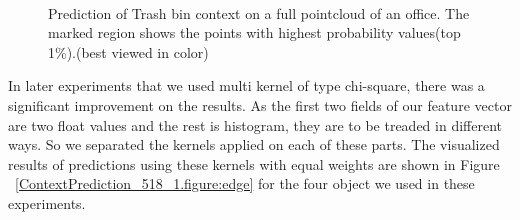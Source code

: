 \begin{figure} [htp]
   \begin{center}
     \\
  \end{center}
  \caption[Prediction of Trash bin model.]
  {Prediction of Trash bin context on a full pointcloud of an office. The marked region shows the points with highest probability values(top 1\%).(best viewed in color)}
  \label{TrashPrediction.figure:edge}
\end{figure}

In later experiments that we used multi kernel of type chi-square, there was a significant improvement on the results.
As the first two fields of our feature vector are two float values and the rest is histogram, they are to be treaded 
in different ways.
So we separated the kernels applied on each of these parts.
The visualized results of predictions using these kernels with equal weights are shown in Figure ~\ref{ContextPrediction_518_1.figure:edge} 
for the four object we used in these experiments.

